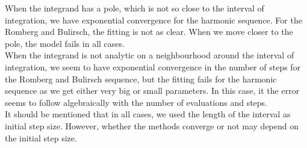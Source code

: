 When the integrand has a pole, which is not so close to the interval of integration, we have exponential convergence for the harmonic sequence. For the Romberg and Bulirsch, the fitting is not as clear. When we move closer to the pole, the model fails in all cases.\\

When the integrand is not analytic on a neighbourhood around the interval of integration, we seem to have exponential convergence in the number of steps for the Romberg and Bulirsch sequence, but the fitting fails for the harmonic sequence as we get either very big or small parameters. In this case, it the error seems to follow algebraically with the number of evaluations and steps.\\

It should be mentioned that in all cases, we used the length of the interval as initial step size. However, whether the methods converge or not may depend on the initial step size.\\

